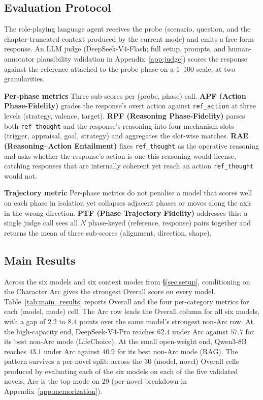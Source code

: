 \documentclass{llmxive}
\begin{document}
\subsection{Evaluation Protocol\label{sec:evalproto}}

The role-playing language agent receives the probe (scenario, question, and the chapter-truncated context produced by the current mode) and emits a free-form response. An LLM judge (DeepSeek-V4-Flash; full setup, prompts, and human-annotator plausibility validation in Appendix~\ref{app:judge}) scores the response against the reference attached to the probe phase on a $1$--$100$ scale, at two granularities.

\textbf{Per-phase metrics}
Three sub-scores per (probe, phase) call. \textbf{APF (Action Phase-Fidelity)} grades the response's overt action against \texttt{ref\_action} at three levels (strategy, valence, target). \textbf{RPF (Reasoning Phase-Fidelity)} parses both \texttt{ref\_thought} and the response's reasoning into four mechanism slots (trigger, appraisal, goal, strategy) and aggregates the slot-wise matches. \textbf{RAE (Reasoning--Action Entailment)} fixes \texttt{ref\_thought} as the operative reasoning and asks whether the response's action is one this reasoning would license, catching responses that are internally coherent yet reach an action \texttt{ref\_thought} would not.

\textbf{Trajectory metric}
Per-phase metrics do not penalise a model that scores well on each phase in isolation yet collapses adjacent phases or moves along the axis in the wrong direction. \textbf{PTF (Phase Trajectory Fidelity)} addresses this: a single judge call sees all $N$ phase-keyed (reference, response) pairs together and returns the mean of three sub-scores (alignment, direction, shape).

\subsection{Main Results\label{sec:main}}

Across the six models and six context modes from \S\ref{sec:setup}, conditioning on the Character Arc gives the strongest Overall score on every model. Table~\ref{tab:main_results} reports Overall and the four per-category metrics for each (model, mode) cell. The Arc row leads the Overall column for all six models, with a gap of $2.2$ to $8.4$ points over the same model's strongest non-Arc row. At the high-capacity end, DeepSeek-V4-Pro reaches $62.4$ under Arc against $57.7$ for its best non-Arc mode (LifeChoice). At the small open-weight end, Qwen3-8B reaches $43.1$ under Arc against $40.9$ for its best non-Arc mode (RAG). The pattern survives a per-novel split: across the $30$ (model, novel) Overall cells produced by evaluating each of the six models on each of the five validated novels, Arc is the top mode on $29$ (per-novel breakdown in Appendix~\ref{app:memorization}).
\end{document}
